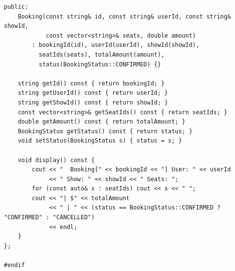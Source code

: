 \documentclass[11pt,a4paper]{article}
\begin{document}
\begin{lstlisting}[title={\texttt{models.hpp}}]
public:
    Booking(const string& id, const string& userId, const string& showId,
            const vector<string>& seats, double amount)
        : bookingId(id), userId(userId), showId(showId),
          seatIds(seats), totalAmount(amount),
          status(BookingStatus::CONFIRMED) {}

    string getId() const { return bookingId; }
    string getUserId() const { return userId; }
    string getShowId() const { return showId; }
    const vector<string>& getSeatIds() const { return seatIds; }
    double getAmount() const { return totalAmount; }
    BookingStatus getStatus() const { return status; }
    void setStatus(BookingStatus s) { status = s; }

    void display() const {
        cout << "  Booking[" << bookingId << "] User: " << userId
             << " Show: " << showId << " Seats: ";
        for (const auto& s : seatIds) cout << s << " ";
        cout << "| $" << totalAmount
             << " | " << (status == BookingStatus::CONFIRMED ? "CONFIRMED" : "CANCELLED")
             << endl;
    }
};

#endif
\end{lstlisting}

\newpage
\end{document}

